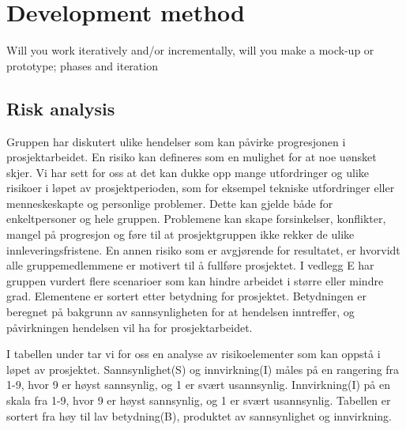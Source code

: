 \section{Development method}
Will you work iteratively and/or incrementally, will you make a 
mock-up or prototype; phases and iteration



\subsection{Risk analysis}
Gruppen har diskutert ulike hendelser som kan påvirke progresjonen i prosjektarbeidet. En risiko
kan defineres som en mulighet for at noe uønsket skjer. Vi har sett for oss at det kan dukke
opp mange utfordringer og ulike risikoer i løpet av prosjektperioden, som for eksempel tekniske
utfordringer eller menneskeskapte og personlige problemer. Dette kan gjelde både for enkeltpersoner
og hele gruppen. Problemene kan skape forsinkelser, konflikter, mangel på progresjon og føre til at
prosjektgruppen ikke rekker de ulike innleveringsfristene. En annen risiko som er avgjørende for
resultatet, er hvorvidt alle gruppemedlemmene er motivert til å fullføre prosjektet.
I vedlegg E har gruppen vurdert flere scenarioer som kan hindre arbeidet i større eller mindre
grad. Elementene er sortert etter betydning for prosjektet. Betydningen er beregnet på bakgrunn av
sannsynligheten for at hendelsen inntreffer, og påvirkningen hendelsen vil ha for prosjektarbeidet.

I tabellen under tar vi for oss en analyse av risikoelementer som kan oppstå i løpet av prosjektet.
Sannsynlighet(S) og innvirkning(I) måles på en rangering fra 1-9, hvor 9 er høyst sannsynlig,
og 1 er svært usannsynlig. Innvirkning(I) på en skala fra 1-9, hvor 9 er høyst sannsynlig, og 1 er
svært usannsynlig. Tabellen er sortert fra høy til lav betydning(B), produktet av sannsynlighet og
innvirkning.


